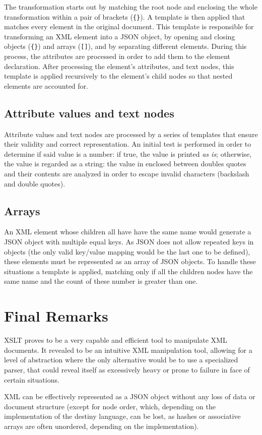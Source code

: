 \documentclass[twocolumn,twoside,10pt,a4paper]{article}
\begin{document}
The transformation starts out by matching the root node and enclosing the whole transformation within a pair of brackets (\verb!{}!). A template is then applied that matches every element in the original document. This template is responsible for transforming an XML element into a JSON object, by opening and closing objects (\verb!{}!) and arrays (\verb![]!), and by separating different elements. During this process, the attributes are processed in order to add them to the element declaration. After processing the element's attributes, and text nodes, this template is applied recursively to the element's child nodes so that nested elements are accounted for.

\subsection{Attribute values and text nodes}

Attribute values and text nodes are processed by a series of templates that ensure their validity and correct representation\cite{json_format}. An initial test is performed in order to determine if said value is a number: if true, the value is printed \textit{as is}; otherwise, the value is regarded as a string: the value in enclosed between doubles quotes and their contents are analyzed in order to escape invalid characters (backslash and double quotes).

\subsection{Arrays}
An XML element whose children all have have the same name would generate a JSON object with multiple equal keys. As JSON does not allow repeated keys in objects (the only valid key/value mapping would be the last one to be defined), these elements must be represented as an array of JSON objects. To handle these situations a template is applied, matching only if all the children nodes have the same name and the count of these number is greater than one.

\section{Final Remarks}\label{sec:final-remarks}


XSLT proves to be a very capable and efficient tool to manipulate XML documents. It revealed to be an intuitive XML manipulation tool, allowing for a level of abstraction where the only alternative would be to use a specialized parser, that could reveal itself as excessively heavy or prone to failure in face of certain situations.

XML can be effectively represented as a JSON object without any loss of data or document structure (except for node order, which, depending on the implementation of the destiny language, can be lost, as hashes or associative arrays are often unordered, depending on the implementation).


\renewcommand{\bibname}{References}


\end{document}
